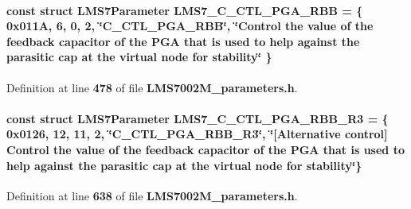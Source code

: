 \paragraph[{L\+M\+S7\+\_\+\+C\+\_\+\+C\+T\+L\+\_\+\+P\+G\+A\+\_\+\+R\+BB}]{\setlength{\rightskip}{0pt plus 5cm}const struct {\bf L\+M\+S7\+Parameter} L\+M\+S7\+\_\+\+C\+\_\+\+C\+T\+L\+\_\+\+P\+G\+A\+\_\+\+R\+BB = \{ 0x011\+A, 6, 0, 2, \char`\"{}\+C\+\_\+\+C\+T\+L\+\_\+\+P\+G\+A\+\_\+\+R\+B\+B\char`\"{}, \char`\"{}\+Control the value of the feedback capacitor of the P\+G\+A that is used to help against the parasitic cap at the virtual node for stability\char`\"{} \}\hspace{0.3cm}{\ttfamily [static]}}\label{LMS7002M__parameters_8h_a520661012978a58e3b163288d2eef481}


Definition at line {\bf 478} of file {\bf L\+M\+S7002\+M\+\_\+parameters.\+h}.

\paragraph[{L\+M\+S7\+\_\+\+C\+\_\+\+C\+T\+L\+\_\+\+P\+G\+A\+\_\+\+R\+B\+B\+\_\+\+R3}]{\setlength{\rightskip}{0pt plus 5cm}const struct {\bf L\+M\+S7\+Parameter} L\+M\+S7\+\_\+\+C\+\_\+\+C\+T\+L\+\_\+\+P\+G\+A\+\_\+\+R\+B\+B\+\_\+\+R3 = \{ 0x0126, 12, 11, 2, \char`\"{}\+C\+\_\+\+C\+T\+L\+\_\+\+P\+G\+A\+\_\+\+R\+B\+B\+\_\+\+R3\char`\"{}, \char`\"{}[\+Alternative control] Control the value of the feedback capacitor of the P\+G\+A that is used to help against the parasitic cap at the virtual node for stability\char`\"{}\}\hspace{0.3cm}{\ttfamily [static]}}\label{LMS7002M__parameters_8h_a628cdc2abd8207dbb2dfb5cbe4afa2f2}


Definition at line {\bf 638} of file {\bf L\+M\+S7002\+M\+\_\+parameters.\+h}.

